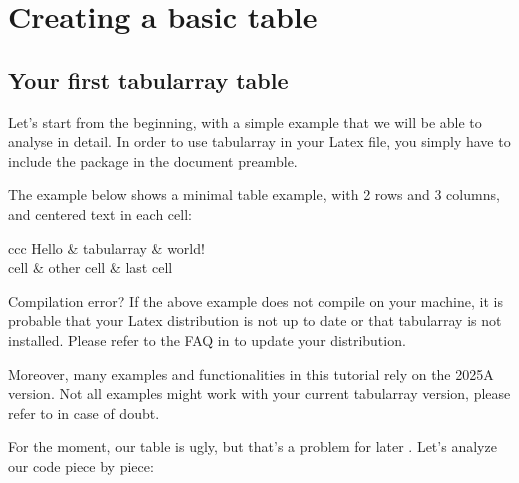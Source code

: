 \chapter{Creating a basic table}\label{sec:basic}

\section{Your first tabularray table}
Let's start from the beginning, with a simple example that we will be able to analyse in detail. 
In order to use tabularray in your Latex file, you simply have to include the package in the document preamble. 


The example below shows a minimal table example, with 2 rows and 3 columns, and centered text in each cell:

\begin{Code}
\begin{tblr}{ccc}
	Hello & tabularray & world! \\
	cell & other cell & last cell \\
\end{tblr}
\end{Code}

\begin{warningbox}{Compilation error?}
If the above example does not compile on your machine, it is probable that your Latex distribution is not up to date or that tabularray is not installed. Please refer to the FAQ in  to update your distribution.

Moreover, many examples and functionalities in this tutorial rely on the 2025A version. Not all examples might work with your current tabularray version, please refer to  in case of doubt.
\end{warningbox}

For the moment, our table is ugly, but that's a problem for later . Let's analyze our code piece by piece:

